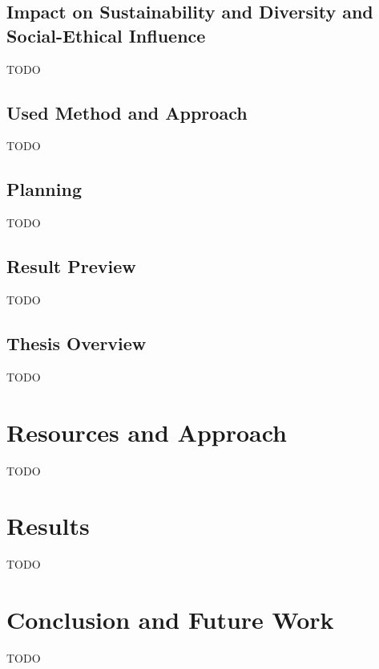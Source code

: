 \documentclass[12pt]{article}
\begin{document}
	\subsection{Impact on Sustainability and Diversity and Social-Ethical Influence}
    TODO
	\subsection{Used Method and Approach}
    TODO
	\subsection{Planning}
	TODO
	\subsection{Result Preview}
	TODO
	\subsection{Thesis Overview}
	TODO	
	\section{Resources and Approach}
	TODO
	\section{Results}
	TODO
	\section{Conclusion and Future Work}
	TODO

\end{document}
